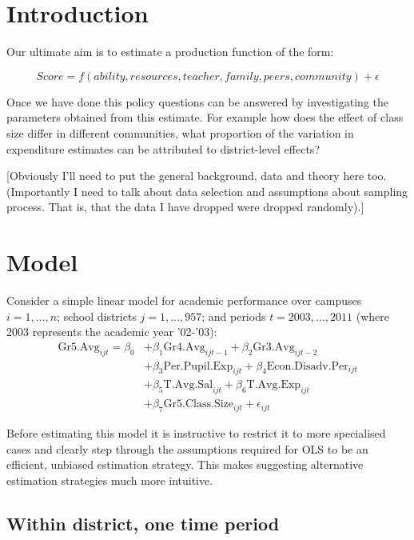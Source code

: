 \documentclass[11pt]{article}
\begin{document}
\setlength{\baselineskip}{0.3in} 


\section{Introduction}
\label{s:intro}

Our ultimate aim is to estimate a production function of the form:

$$Score = f(ability,resources,teacher,family,peers,community) + \epsilon$$

Once we have done this policy questions can be answered by investigating the parameters obtained from this estimate. For example how does the effect of class size differ in different communities, what proportion of the variation in expenditure estimates can be attributed to district-level effects?

[Obviously I'll need to put the general background, data and theory here too. (Importantly I need to talk about data selection and assumptions about sampling process. That is, that the data I have dropped were dropped randomly).]

\section{Model}
\label{s:next}


Consider a simple linear model for academic performance over campuses $i=1,\ldots,n$; school districts $j=1,\ldots,957$; and periods $t=2003,\ldots,2011$ (where 2003 represents the academic year '02-'03):
\begin{align*}
\mathrm{Gr5.Avg}_{ijt} = \beta_{0} 
    &+ \beta_{1}  \mathrm{Gr4.Avg}_{ijt-1} 
    + \beta_{2}  \mathrm{Gr3.Avg}_{ijt-2}    \\
    &+ \beta_{3}  \mathrm{Per.Pupil.Exp}_{ijt} 
    + \beta_{4}  \mathrm{Econ.Disadv.Per}_{ijt} \\
    &+ \beta_{5}  \mathrm{T.Avg.Sal}_{ijt}   
    + \beta_{6}  \mathrm{T.Avg.Exp}_{ijt}  \\
    &+ \beta_{7}  \mathrm{Gr5.Class.Size}_{ijt} + \epsilon_{ijt}
\end{align*}


Before estimating this model it is instructive to restrict it to more specialised cases and clearly step through the assumptions required for OLS to be an efficient, unbiased estimation strategy. This makes suggesting alternative estimation strategies much more intuitive.

\subsection{Within district, one time period}
\label{ss:nextsub1}
\end{document}
